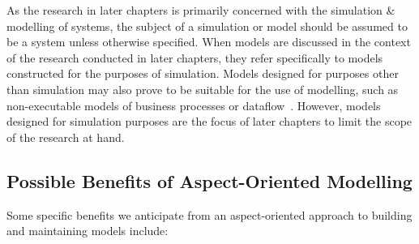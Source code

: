 As the research in later chapters is primarily concerned with the simulation \&
modelling of \sociotechnical systems, the subject of a simulation or model
should be assumed to be a \sociotechnical system unless otherwise specified.
When models are discussed in the context of the research conducted in later
chapters, they refer specifically to models constructed for the purposes of
simulation. Models designed for purposes other than simulation may also prove to
be suitable for the use of \aspectoriented{} modelling, such as non-executable
models of business processes or
dataflow~\cite{obashimethodology,Cappelli_AOBPM,charfi2010AO4BPMN}. However,
models designed for simulation purposes are the focus of later chapters to limit
the scope of the research at hand.

\subsection{Possible Benefits of Aspect-Oriented Modelling}
Some specific benefits we anticipate from an aspect-oriented approach to
building and maintaining models include:

